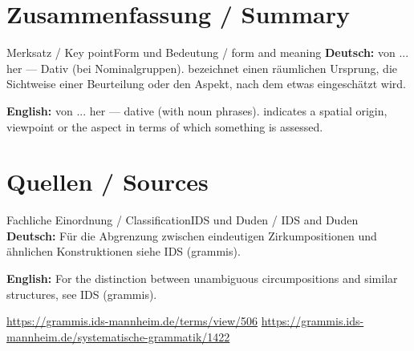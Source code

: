 \documentclass[a4paper,11pt]{article}
\newcommand{\GermanText}[1]{\textbf{Deutsch: }#1\par}
\newcommand{\EnglishText}[1]{{\small\color{SoftGray}\textbf{English: }#1\par}}
\begin{document}
\section{Zusammenfassung / Summary}
\begin{grammarentry}{Merksatz / Key point}{Form und Bedeutung / form and meaning}
\GermanText{von ... her — Dativ (bei Nominalgruppen). bezeichnet einen räumlichen Ursprung, die Sichtweise einer Beurteilung oder den Aspekt, nach dem etwas eingeschätzt wird.}
\EnglishText{von ... her — dative (with noun phrases). indicates a spatial origin, viewpoint or the aspect in terms of which something is assessed.}
\end{grammarentry}
\section{Quellen / Sources}
\begin{grammarentry}{Fachliche Einordnung / Classification}{IDS und Duden / IDS and Duden}
\GermanText{Für die Abgrenzung zwischen eindeutigen Zirkumpositionen und ähnlichen Konstruktionen siehe IDS (grammis).}
\EnglishText{For the distinction between unambiguous circumpositions and similar structures, see IDS (grammis).}
\url{https://grammis.ids-mannheim.de/terms/view/506}
\url{https://grammis.ids-mannheim.de/systematische-grammatik/1422}
\end{grammarentry}
\end{document}
